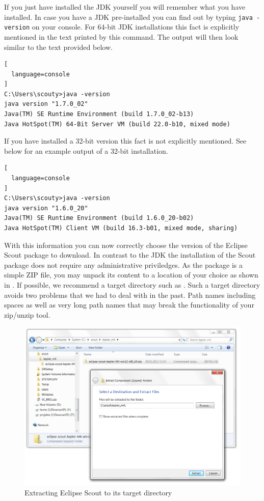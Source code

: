 \documentclass[a4paper,10pt,twoside]{book}
\begin{document}
If you just have installed the JDK yourself you will remember what you have installed. 
In case you have a JDK pre-installed you can find out by typing \texttt{java -version} on your console.
For 64-bit JDK installations this fact is explicitly mentioned in the text printed by this command.
The output will then look similar to the text provided below.

\begin{lstlisting}[
  language=console
]
C:\Users\scouty>java -version
java version "1.7.0_02"
Java(TM) SE Runtime Environment (build 1.7.0_02-b13)
Java HotSpot(TM) 64-Bit Server VM (build 22.0-b10, mixed mode)
\end{lstlisting}

If you have installed a 32-bit version this fact is not explicitly mentioned.
See below for an example output of a 32-bit installation.

\begin{lstlisting}[
  language=console
]
C:\Users\scouty>java -version
java version "1.6.0_20"
Java(TM) SE Runtime Environment (build 1.6.0_20-b02)
Java HotSpot(TM) Client VM (build 16.3-b01, mixed mode, sharing)
\end{lstlisting}

With this information you can now correctly choose the version of the Eclipse Scout package to download.
In contrast to the JDK the installation of the Scout package does not require any administrative priviledges.
As the package is a simple ZIP file, you may unpack its content to a location of your choice as shown in . 
If possible, we recommend a target directory such as 
.
Such a target directory avoids two problems that we had to deal with in the past.
Path names including spaces as well as very long path names that may break the functionality of your zip/unzip tool.

\begin{figure}
\includegraphics[width=15cm]{scout_extract_zip.png}
\caption{Extracting Eclipse Scout to its target directory}
\end{figure}
\end{document}
